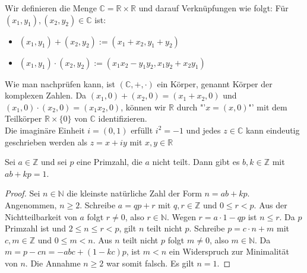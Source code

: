 \begin{example}
	Wir definieren die Menge $\mathbb C = \mathbb R \times \mathbb R$ und darauf Verknüpfungen wie folgt:
	Für $(x_1,y_1), (x_2,y_2) \in \mathbb C$ ist:
	\begin{itemize}
		\item$(x_1,y_1)+(x_2,y_2) := (x_1+x_2,y_1+y_2)$
		\item$(x_1,y_1)\cdot (x_2,y_2) := (x_1x_2-y_1y_2,x_1y_2+x_2y_1)$
	\end{itemize}
	Wie man nachprüfen kann, ist $(\mathbb C,+,\cdot)$ ein Körper, genannt Körper der komplexen Zahlen.
	Da $(x_1,0)+(x_2,0)=(x_1+x_2,0)$ und $(x_1,0)\cdot (x_2,0)=(x_1x_2,0)$, können wir $\mathbb R$ durch
	"'$x=(x,0)$"' mit dem Teilkörper $\mathbb R \times \{0\}$ von $\mathbb C$ identifizieren. \\
	Die imaginäre Einheit $i=(0,1)$ erfüllt $i^2=-1$ und jedes $z \in \mathbb C$ kann eindeutig geschrieben
	werden als $z=x+iy$ mit $x,y \in \mathbb R$
\end{example}


\begin{lemma}
	Sei $a \in \mathbb Z$ und sei $p$ eine Primzahl, die $a$ nicht teilt. Dann gibt es $b,k \in
	\mathbb Z$ mit $ab+kp=1$.
\end{lemma}
\begin{proof}
	Sei $n \in \mathbb N$ die kleinste natürliche Zahl der Form $n=ab+kp$. Angenommen, $n \ge 2$. Schreibe
	$a=qp+r$ mit $q,r \in \mathbb Z$ und $0 \le r < p$. Aus der Nichtteilbarkeit von $a$ folgt $r \neq 0$, also 
	$r \in \mathbb N$. Wegen $r=a\cdot 1-qp$ ist $n\le r$. Da $p$ Primzahl ist und $2\le n\le r < p$, gilt $n$ teilt
	nicht $p$. Schreibe $p=c\cdot n+m$ mit $c,m \in \mathbb Z$ und $0 \le m<n$. Aus $n$ teilt nicht $p$ folgt
	$m \neq 0$, also $m \in \mathbb N$. Da $m=p-cn=-abc+(1-kc)p$, ist $m<n$ ein Widerspruch zur Minimalität
	von $n$. Die Annahme $n \ge 2$ war somit falsch. Es gilt $n=1$.
\end{proof}

